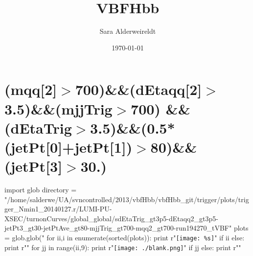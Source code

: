 \documentclass[12pt,english,dvipsnames]{beamer}
\author[S. Alderweireldt]{Sara Alderweireldt}
\date{\today}
\institute[UA]{\small Universiteit Antwerpen}
\title{VBFHbb}
\newcommand{\UAoverlay}[0]{%
\begin{tikzpicture}[remember picture,overlay,shift={(current page.north east)}]
\node (zero) at (-1.8cm,-0.93cm) {\texttt{[image: ../logos/CMS.pdf]}\hspace{0.15cm}\texttt{[image: ../logos/CERN.pdf]}\hspace{0.15cm}\texttt{[image: ../logos/UA.pdf]}}; 
\end{tikzpicture}
}
\begin{document}
\section{\tiny (mqq[2]$>$700)\&\&(dEtaqq[2]$>$3.5)\&\&(mjjTrig$>$700) \&\&(dEtaTrig$>$3.5)\&\&(0.5*(jetPt[0]+jetPt[1])$>$80)\&\&(jetPt[3]$>$30.)}
\begin{frame}[t,fragile]%
\begin{python}
import glob
directory = "/home/salderwe/UA/svncontrolled/2013/vbfHbb/vbfHbb_git/trigger/plots/trigger_Nmin1_20140127.r/LUMI-PU-XSEC/turnonCurves/global_global/sdEtaTrig_gt3p5-dEtaqq2_gt3p5-jetPt3_gt30-jetPtAve_gt80-mjjTrig_gt700-mqq2_gt700-run194270_tVBF"
plots = glob.glob("%
for ii,i in enumerate(sorted(plots)):
  print r"\texttt{[image: \%s]}"%
  if ii%
  else: print r"\hfill"
for jj in range(ii,9):
  print r"\texttt{[image: ./blank.png]}"
  if jj%
  else: print r"\hfill"
\end{python}

\end{frame}
% 
\end{document}
